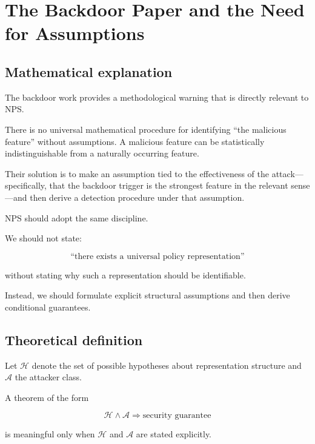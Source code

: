 \documentclass[11pt]{article}
\begin{document}
\section{The Backdoor Paper and the Need for Assumptions}

\subsection*{Mathematical explanation}

The backdoor work provides a methodological warning that is directly relevant
to NPS.

There is no universal mathematical procedure for identifying ``the malicious
feature'' without assumptions. A malicious feature can be statistically
indistinguishable from a naturally occurring feature.

Their solution is to make an assumption tied to the effectiveness of the
attack---specifically, that the backdoor trigger is the strongest feature in
the relevant sense---and then derive a detection procedure under that
assumption.

NPS should adopt the same discipline.

We should not state:

\begin{equation}
\text{``there exists a universal policy representation''}
\end{equation}

without stating why such a representation should be identifiable.

Instead, we should formulate explicit structural assumptions and then derive
conditional guarantees.

\subsection*{Theoretical definition}

Let $\mathcal H$ denote the set of possible hypotheses about representation
structure and $\mathcal A$ the attacker class.

A theorem of the form

\begin{equation}
\mathcal H\land\mathcal A
\Longrightarrow
\text{security guarantee}
\end{equation}

is meaningful only when $\mathcal H$ and $\mathcal A$ are stated explicitly.
\end{document}
